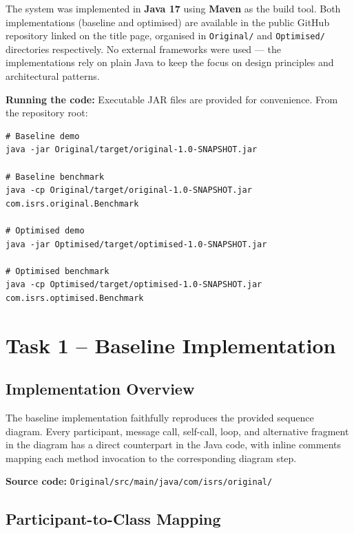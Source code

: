 \documentclass[12pt, a4paper]{article}
\begin{document}
The system was implemented in \textbf{Java 17} using \textbf{Maven} as the build tool. Both implementations (baseline and optimised) are available in the public GitHub repository linked on the title page, organised in \texttt{Original/} and \texttt{Optimised/} directories respectively. No external frameworks were used --- the implementations rely on plain Java to keep the focus on design principles and architectural patterns.

\textbf{Running the code:} Executable JAR files are provided for convenience. From the repository root:

\begin{lstlisting}[style=outputstyle]
# Baseline demo
java -jar Original/target/original-1.0-SNAPSHOT.jar

# Baseline benchmark
java -cp Original/target/original-1.0-SNAPSHOT.jar com.isrs.original.Benchmark

# Optimised demo
java -jar Optimised/target/optimised-1.0-SNAPSHOT.jar

# Optimised benchmark
java -cp Optimised/target/optimised-1.0-SNAPSHOT.jar com.isrs.optimised.Benchmark
\end{lstlisting}

\section{Task 1 -- Baseline Implementation}
\label{sec:task1}

\subsection{Implementation Overview}

The baseline implementation faithfully reproduces the provided sequence diagram. Every participant, message call, self-call, loop, and alternative fragment in the diagram has a direct counterpart in the Java code, with inline comments mapping each method invocation to the corresponding diagram step.

\textbf{Source code:} \texttt{Original/src/main/java/com/isrs/original/}

\subsection{Participant-to-Class Mapping}
\end{document}
